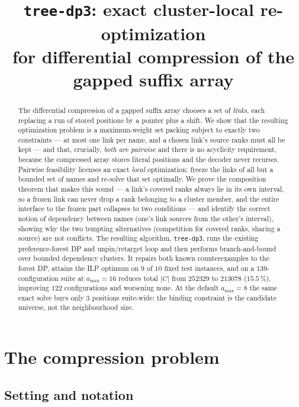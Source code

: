 \documentclass[11pt,a4paper]{article}
\title{\texttt{tree-dp3}: exact cluster-local re-optimization\\
for differential compression of the gapped suffix array}
\author{}
\date{}
\theoremstyle{definition}
\theoremstyle{plain}
\theoremstyle{remark}
\begin{document}
\maketitle

\begin{abstract}
\noindent
The differential compression of a gapped suffix array chooses a set of
\emph{links}, each replacing a run of stored positions by a pointer plus
a shift. We show that the resulting optimization problem is a
maximum-weight set packing subject to exactly two constraints --- at most
one link per name, and a chosen link's source ranks must all be kept ---
and that, crucially, \emph{both are pairwise} and there is no acyclicity
requirement, because the compressed array stores literal positions and
the decoder never recurses. Pairwise feasibility licenses an exact
\emph{local} optimization: freeze the links of all but a bounded set of
names and re-solve that set optimally. We prove the composition theorem
that makes this sound --- a link's covered ranks always lie in its own
interval, so a frozen link can never drop a rank belonging to a cluster
member, and the entire interface to the frozen part collapses to two
conditions --- and identify the correct notion of dependency between
names (one's link sources from the other's interval), showing why the two
tempting alternatives (competition for covered ranks, sharing a source)
are not conflicts. The resulting algorithm, \texttt{tree-dp3}, runs the
existing preference-forest DP and unpin/retarget loop and then performs
branch-and-bound over bounded dependency clusters. It repairs both known
counterexamples to the forest DP, attains the ILP optimum on $9$ of $10$
fixed test instances, and on a $139$-configuration suite at
$a_{\max}=16$ reduces total $|C|$ from $252329$ to $213078$
($15.5\,\%$), improving $122$ configurations and worsening none. At the
default $a_{\max}=8$ the same exact solve buys only $3$ positions
suite-wide: the binding constraint is the candidate universe, not the
neighbourhood size.
\end{abstract}

\tableofcontents

\section{The compression problem}
\label{sec:problem}

\subsection{Setting and notation}
\end{document}
